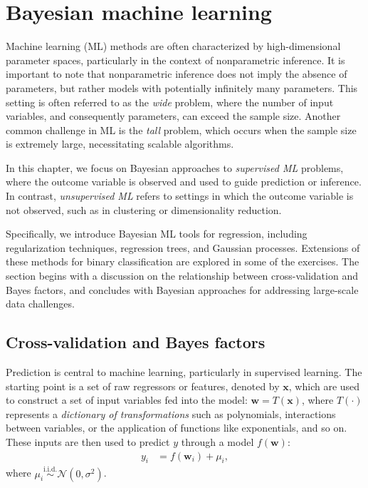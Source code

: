 \chapter{Bayesian machine learning}\label{chap13}

Machine learning (ML) methods are often characterized by high-dimensional parameter spaces, particularly in the context of nonparametric inference. It is important to note that nonparametric inference does not imply the absence of parameters, but rather models with potentially infinitely many parameters. This setting is often referred to as the \textit{wide} problem, where the number of input variables, and consequently parameters, can exceed the sample size. Another common challenge in ML is the \textit{tall} problem, which occurs when the sample size is extremely large, necessitating scalable algorithms.

In this chapter, we focus on Bayesian approaches to \textit{supervised ML} problems, where the outcome variable is observed and used to guide prediction or inference. In contrast, \textit{unsupervised ML} refers to settings in which the outcome variable is not observed, such as in clustering or dimensionality reduction.

Specifically, we introduce Bayesian ML tools for regression, including regularization techniques, regression trees, and Gaussian processes. Extensions of these methods for binary classification are explored in some of the exercises. The section begins with a discussion on the relationship between cross-validation and Bayes factors, and concludes with Bayesian approaches for addressing large-scale data challenges.

\section{Cross-validation and Bayes factors}\label{sec13_1}
Prediction is central to machine learning, particularly in supervised learning. The starting point is a set of raw regressors or features, denoted by \( \mathbf{x} \), which are used to construct a set of input variables fed into the model: \( \mathbf{w} = T(\mathbf{x}) \), where \( T(\cdot) \) represents a \textit{dictionary of transformations} such as polynomials, interactions between variables, or the application of functions like exponentials, and so on. These inputs are then used to predict \( y \) through a model \( f(\mathbf{w}) \):
\begin{align*}
	y_i &= f(\mathbf{w}_i) + \mu_i,
\end{align*}
where \( \mu_i \stackrel{\text{i.i.d.}}{\sim} \mathcal{N}(0, \sigma^2) \).

